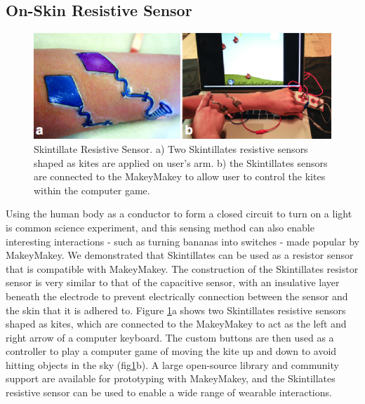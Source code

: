 \documentclass{sigchi}
\begin{document}
\subsection {On-Skin Resistive Sensor}
\begin{figure} [h!]
\centering
\includegraphics[width=1\columnwidth]{figures/Figure9}
\caption{Skintillate Resistive Sensor. a) Two Skintillates resistive sensors shaped as kites are applied on user's arm. b) the Skintillates sensors are connected to the MakeyMakey to allow user to control the kites within the computer game.}
\vspace{-8pt}
\label{fig:resisitve}
\end{figure}
Using the human body as a conductor to form a closed circuit to turn on a light is common science experiment, and this sensing method can also enable interesting interactions - such as turning bananas into switches - made popular by MakeyMakey. We demonstrated that Skintillates can be used as a resistor sensor that is compatible with MakeyMakey. The construction of the Skintillates resistor sensor is very similar to that of the capacitive sensor, with an insulative layer beneath the electrode to prevent electrically connection between the sensor and the skin that it is adhered to. Figure \ref{fig:resisitve}a shows two Skintillates resistive sensors shaped as kites, which are connected to the MakeyMakey to act as the left and right arrow of a computer keyboard. The custom buttons are then used as a controller to play a computer game of moving the kite up and down to avoid hitting objects in the sky (fig\ref{fig:resisitve}b). A large open-source library and community support are available for prototyping with MakeyMakey, and the Skintillates resistive sensor can be used to enable a wide range of wearable interactions. 
\end{document}
